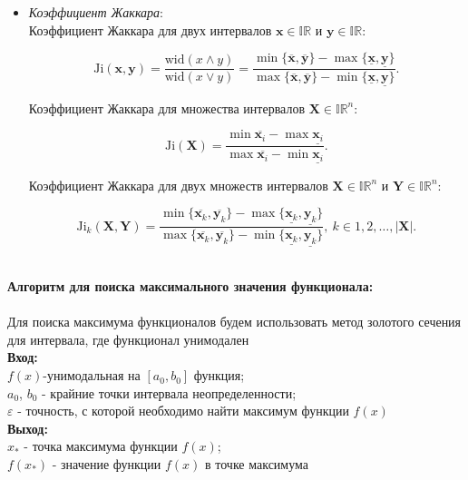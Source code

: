 \documentclass[a4paper,12pt]{article}
\begin{document}
\begin{itemize}
\item \textit{Коэффициент Жаккара}:\\
 Коэффициент Жаккара для двух интервалов \( \mathbf{x} \in \mathbb{IR} \)
  и \( \mathbf{y} \in \mathbb{IR} \):

  \begin{equation*}
    \text{Ji} (\mathbf{x}, \mathbf{y})
      = \frac{\text{wid} (x \land y)}{\text{wid} (x \lor y)}
      = \frac{\min \{ \overline{\mathbf{x}}, \overline{\mathbf{y}} \} - \max \{ \underline{\mathbf{x}}, \underline{\mathbf{y}} \}}
        {\max\{ \overline{\mathbf{x}}, \overline{\mathbf{y}} \} - \min \{ \underline{\mathbf{x}}, \underline{\mathbf{y}} \}}.
  \end{equation*}

  Коэффициент Жаккара для множества интервалов
  \( \mathbf{X} \in \mathbb{IR}^n \):

  \begin{equation*}
    \text{Ji} (\mathbf{X})
      = \frac{\min \overline{\mathbf{x}_i} - \max \underline{\mathbf{x}_i}}
        {\max \overline{\mathbf{x}_i} - \min \underline{\mathbf{x}_i}}.
  \end{equation*}

  Коэффициент Жаккара для двух множеств интервалов
  \( \mathbf{X} \in \mathbb{IR}^n \) и \( \mathbf{Y} \in \mathbb{IR}^n \):

  \begin{equation*}
    \text{Ji}_k (\mathbf{X}, \mathbf{Y})
      = \frac{\min \{ \overline{\mathbf{x}_k}, \overline{\mathbf{y}_k} \} - \max \{ \underline{\mathbf{x}_k}, \underline{\mathbf{y}_k} \}}
        {\max\{ \overline{\mathbf{x}_k}, \overline{\mathbf{y}_k} \} - \min \{ \underline{\mathbf{x}_k}, \underline{\mathbf{y}_k} \}},
      \ k \in 1, 2, \dots, |\mathbf{X}|.
  \end{equation*}
\end{itemize}
\vspace{0.5cm}
\\\textbf{Алгоритм для поиска максимального значения функционала:}\\\\
Для поиска максимума функционалов будем использовать метод золотого сечения для интервала, где функционал унимодален\\
\textbf{Вход:} 
\\$f(x)$-унимодальная на $[a_0,b_0]$ функция; 
\\$a_0$, $b_0$ - крайние точки интервала неопределенности;
\\$\varepsilon$ - точность, с которой необходимо найти максимум функции $f(x)$
\\
\textbf{Выход:} 
\\$x_*$ - точка максимума функции $f(x)$;
\\$f(x_*)$ - значение функции $f(x)$ в точке максимума
\end{document}
